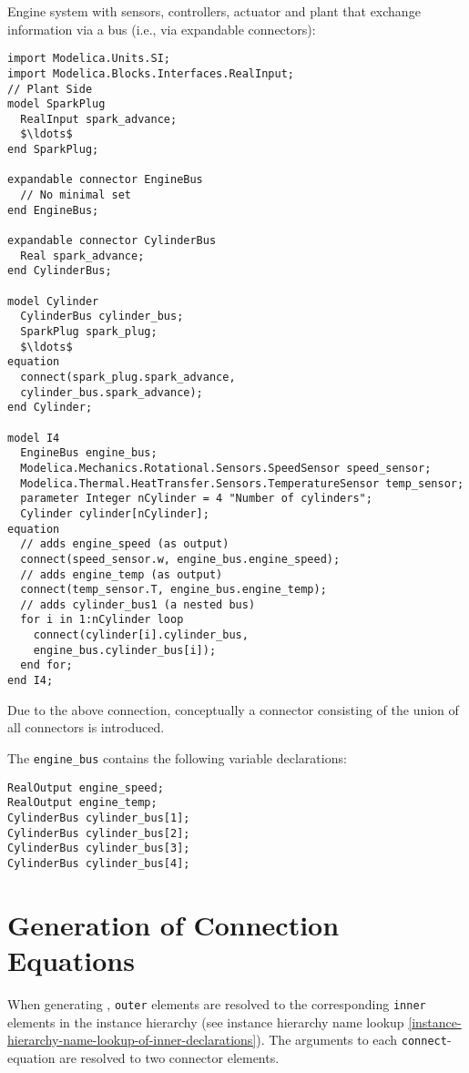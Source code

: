 \begin{example}
Engine system with sensors, controllers, actuator and plant that exchange information via a bus (i.e., via expandable connectors):
\begin{lstlisting}[language=modelica]
import Modelica.Units.SI;
import Modelica.Blocks.Interfaces.RealInput;
// Plant Side
model SparkPlug
  RealInput spark_advance;
  $\ldots$
end SparkPlug;

expandable connector EngineBus
  // No minimal set
end EngineBus;

expandable connector CylinderBus
  Real spark_advance;
end CylinderBus;

model Cylinder
  CylinderBus cylinder_bus;
  SparkPlug spark_plug;
  $\ldots$
equation
  connect(spark_plug.spark_advance,
  cylinder_bus.spark_advance);
end Cylinder;

model I4
  EngineBus engine_bus;
  Modelica.Mechanics.Rotational.Sensors.SpeedSensor speed_sensor;
  Modelica.Thermal.HeatTransfer.Sensors.TemperatureSensor temp_sensor;
  parameter Integer nCylinder = 4 "Number of cylinders";
  Cylinder cylinder[nCylinder];
equation
  // adds engine_speed (as output)
  connect(speed_sensor.w, engine_bus.engine_speed);
  // adds engine_temp (as output)
  connect(temp_sensor.T, engine_bus.engine_temp);
  // adds cylinder_bus1 (a nested bus)
  for i in 1:nCylinder loop
    connect(cylinder[i].cylinder_bus,
    engine_bus.cylinder_bus[i]);
  end for;
end I4;
\end{lstlisting}
Due to the above connection, conceptually a connector consisting of the union of all connectors is introduced.

The \lstinline!engine_bus! contains the following variable declarations:
\begin{lstlisting}[language=modelica]
RealOutput engine_speed;
RealOutput engine_temp;
CylinderBus cylinder_bus[1];
CylinderBus cylinder_bus[2];
CylinderBus cylinder_bus[3];
CylinderBus cylinder_bus[4];
\end{lstlisting}
\end{example}

\section{Generation of Connection Equations}\label{generation-of-connection-equations}

When generating , \lstinline!outer! elements are resolved to the corresponding \lstinline!inner! elements in the instance hierarchy (see instance hierarchy name lookup \cref{instance-hierarchy-name-lookup-of-inner-declarations}).
The arguments to each \lstinline!connect!-equation are resolved to two connector elements.

